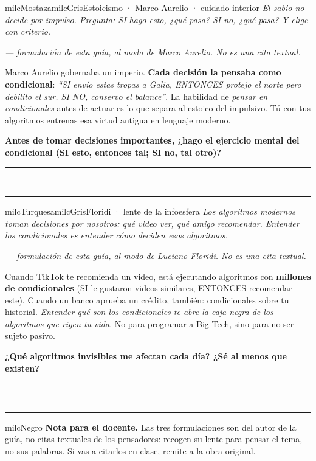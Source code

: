\documentclass[11pt,letterpaper]{article}
\newcommand{\linead}[1]{\noindent\color{milcLinea}\rule{#1}{0.5pt}\color{milcNegro}}
\begin{document}
\begin{softbox}{milcMostaza}{milcGris}{Estoicismo · Marco Aurelio · cuidado interior}
\textit{El sabio no decide por impulso. Pregunta: SI hago esto, ¿qué pasa? SI no, ¿qué pasa? Y elige con criterio.}

{\footnotesize\itshape\color{milcNegro!70}--- formulación de esta guía, al modo de Marco Aurelio. No es una cita textual.}

Marco Aurelio gobernaba un imperio. \textbf{Cada decisión la pensaba como condicional}: \emph{``SI envío estas tropas a Galia, ENTONCES protejo el norte pero debilito el sur. SI NO, conservo el balance''}. La habilidad de \emph{pensar en condicionales} antes de actuar es lo que separa al estoico del impulsivo. Tú con tus algoritmos entrenas esa virtud antigua en lenguaje moderno.

\textbf{Antes de tomar decisiones importantes, ¿hago el ejercicio mental del condicional (SI esto, entonces tal; SI no, tal otro)?}
\end{softbox}
\linead{\linewidth}\\[1mm]
\linead{\linewidth}

\begin{softbox}{milcTurquesa}{milcGris}{Floridi · lente de la infoesfera}
\textit{Los algoritmos modernos toman decisiones por nosotros: qué video ver, qué amigo recomendar. Entender los condicionales es entender cómo deciden esos algoritmos.}

{\footnotesize\itshape\color{milcNegro!70}--- formulación de esta guía, al modo de Luciano Floridi. No es una cita textual.}

Cuando TikTok te recomienda un video, está ejecutando algoritmos con \textbf{millones de condicionales} (SI le gustaron videos similares, ENTONCES recomendar este). Cuando un banco aprueba un crédito, también: condicionales sobre tu historial. \emph{Entender qué son los condicionales te abre la caja negra de los algoritmos que rigen tu vida}. No para programar a Big Tech, sino para no ser sujeto pasivo.

\textbf{¿Qué algoritmos invisibles me afectan cada día? ¿Sé al menos que existen?}
\end{softbox}
\linead{\linewidth}\\[1mm]
\linead{\linewidth}

\begin{infoband}{milcNegro}
\textbf{Nota para el docente.} Las tres formulaciones son del autor de la guía, no citas textuales de los pensadores: recogen su lente para pensar el tema, no sus palabras. Si vas a citarlos en clase, remite a la obra original.
\end{infoband}
\end{document}
